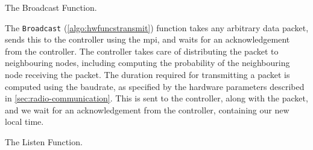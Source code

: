 \begin{algorithm}[ht]
    \DontPrintSemicolon
    

    \caption{The Broadcast Function.}
    \label{algo:hwfuncstransmit}
\end{algorithm}

The \texttt{Broadcast} (\autoref{algo:hwfuncstransmit}) function takes any arbitrary data packet, sends this to the controller using the \gls{mpi}, and waits for an acknowledgement from the controller. The controller takes care of distributing the packet to neighbouring nodes, including computing the probability of the neighbouring node receiving the packet. The duration required for transmitting a packet is computed using the baudrate, as specified by the hardware parameters described in \autoref{sec:radio-communication}. This is sent to the controller, along with the packet, and we wait for an acknowledgement from the controller, containing our new local time.\medbreak
{}

\begin{algorithm}[ht]
    \DontPrintSemicolon
    
    
    \caption{The Listen Function.}
    \label{algo:hwfuncslisten}
\end{algorithm}

